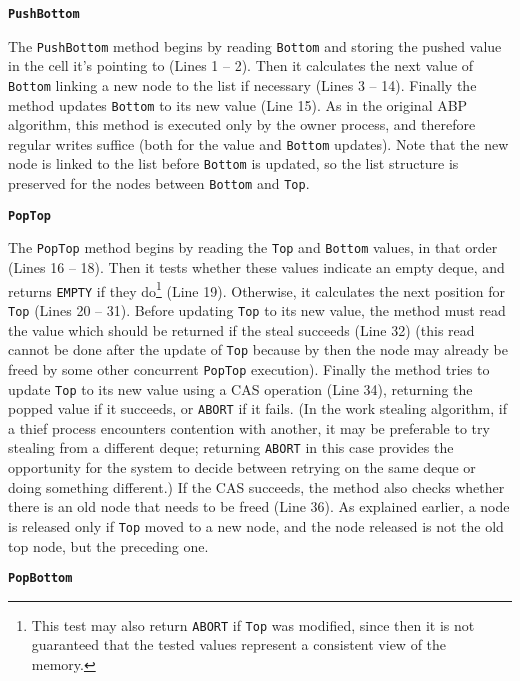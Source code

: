\textbf{\lstinline!PushBottom!}

The \lstinline!PushBottom! method begins by reading \lstinline!Bottom!
and storing the pushed value in the cell it's pointing to (Lines
1 -- 2). Then it calculates the next value of \lstinline!Bottom! linking
a new node to the list if necessary (Lines 3 -- 14). Finally the method
updates \lstinline!Bottom! to its new value (Line 15). As in the
original ABP algorithm, this method is executed only by the owner
process, and therefore regular writes suffice (both for the value and
\lstinline!Bottom! updates). Note that the new node is linked to the
list before \lstinline!Bottom! is updated, so the list structure is
preserved for the nodes between \lstinline!Bottom! and
\lstinline!Top!.

\textbf{\lstinline!PopTop!}

The \lstinline!PopTop! method begins by reading the \lstinline!Top!
and \lstinline!Bottom! values, in that order (Lines 16 -- 18). Then it
tests whether these values indicate an empty deque, and returns
\lstinline!EMPTY! if they do\footnote{This test may also return
  \lstinline!ABORT! if \lstinline!Top! was modified, since then it is
  not guaranteed that the tested values represent a consistent view of
  the memory.} (Line 19). Otherwise, it calculates the next position
for \lstinline!Top! (Lines 20 -- 31). Before updating \lstinline!Top! to
its new value, the method must read the value which should be returned
if the steal succeeds (Line 32) (this read cannot be done after the
update of \lstinline!Top! because by then the node may already be
freed by some other concurrent \lstinline!PopTop! execution). Finally
the method tries to update \lstinline!Top! to its new value using a
CAS operation (Line 34), returning the popped value if it succeeds, or
\lstinline!ABORT! if it fails. (In the work stealing algorithm, if a
thief process encounters contention with another, it may be preferable
to try stealing from a different deque; returning \lstinline!ABORT! in
this case provides the opportunity for the system to decide between
retrying on the same deque or doing something different.) If the CAS
succeeds, the method also checks whether there is an old node that
needs to be freed (Line 36). As explained earlier, a node is released
only if \lstinline!Top! moved to a new node, and the node released is
not the old top node, but the preceding one.

\textbf{\lstinline!PopBottom!}

